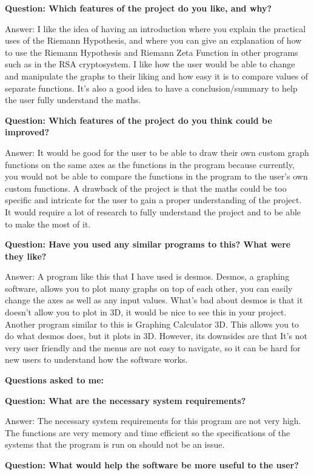 \documentclass{article}
\begin{document}
\textbf{Question: Which features of the project do you like, and why?}

Answer: I like the idea of having an introduction where you explain the practical uses of the Riemann Hypothesis, and where you can give an explanation of how to use the Riemann Hypothesis and Riemann Zeta Function in other programs such as in the RSA cryptosystem. I like how the user would be able to change and manipulate the graphs to their liking and how easy it is to compare values of separate functions. It’s also a good idea to have a  conclusion/summary to help the user fully understand the maths.

\textbf{Question: Which features of the project do you think could be improved?}

Answer: It would be good for the user to be able to draw their own custom graph functions on the same axes as the functions in the program because currently, you would not be able to compare the functions in the program to the user’s own custom functions. A drawback of the project is that the maths could be too specific and intricate for the user to gain a proper understanding of the project. It would require a lot of research to fully understand the project and to be able to make the most of it.

\textbf{Question: Have you used any similar programs to this? What were they like?}

Answer: A program like this that I have used is desmos. Desmos, a graphing software, allows you to plot many graphs on top of each other, you can easily change the axes as well as any input values. What’s bad about desmos is that it doesn’t allow you to plot in 3D, it would be nice to see this in your project. Another program similar to this is Graphing Calculator 3D.
This allows you to do what desmos does, but it plots in 3D. However, its downsides are that It’s not very user friendly and the menus are not easy to navigate, so it can be hard for new users to understand how the software works.

\textbf{Questions asked to me:}

\textbf{Question: What are the necessary system requirements?}

Answer: The necessary system requirements for this program are not very high. The functions are very memory and time efficient so the specifications of the systems that the program is run on should not be an issue.

\textbf{Question: What would help the software be more useful to the user?}
\end{document}
